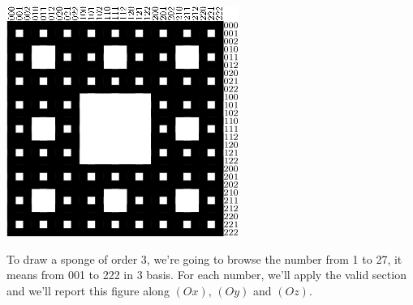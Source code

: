 \begin{center}
\includegraphics{pics/menger-schema10.png}\\ 
\end{center}
To draw a sponge of order 3, we're going to browse the number from 1 to 27, it means from 001 to 222 in 3 basis. For each number, we'll apply the valid section and we'll report this figure along $(Ox)$, $(Oy)$ and $(Oz)$.
